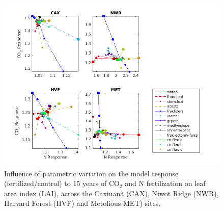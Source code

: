 \documentclass[draft,linenumbers]{agujournal}
\begin{document}
  \begin{figure}[h]
     \centering
     \includegraphics[width=1.55\textwidth, left]{matlab/figures/NOVc_CNdep_TLAI1__p2012.png}
     \caption{Influence of parametric variation on the model response (fertilized/control) to 15 years of CO$_{2}$ and N fertilization on leaf area index (LAI), across the Caxiuan\~a (CAX), Niwot Ridge (NWR), Harvard Forest (HVF) and Metolious MET) sites.}
     \label{LAI CO2 and N respones 2001}
  \end{figure}
  
 
    
 
\end{document}
